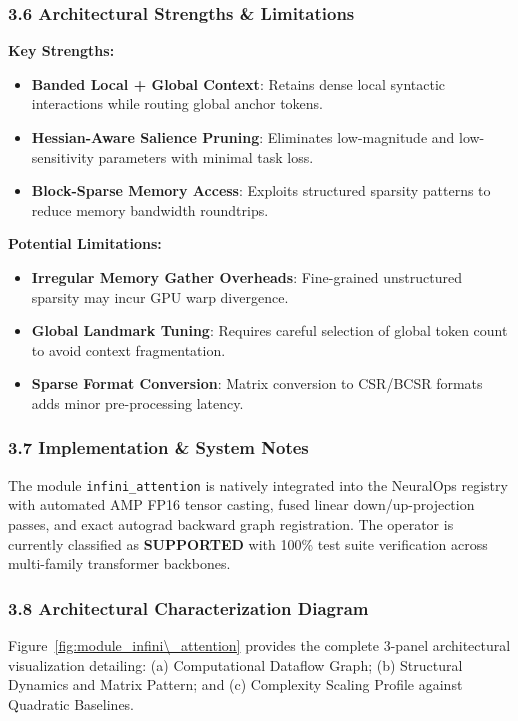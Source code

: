 \subsubsection*{3.6 Architectural Strengths \& Limitations}
\textbf{Key Strengths:}
\begin{itemize}
    \item \textbf{Banded Local + Global Context}: Retains dense local syntactic interactions while routing global anchor tokens.
    \item \textbf{Hessian-Aware Salience Pruning}: Eliminates low-magnitude and low-sensitivity parameters with minimal task loss.
    \item \textbf{Block-Sparse Memory Access}: Exploits structured sparsity patterns to reduce memory bandwidth roundtrips.
\end{itemize}

\textbf{Potential Limitations:}
\begin{itemize}
    \item \textbf{Irregular Memory Gather Overheads}: Fine-grained unstructured sparsity may incur GPU warp divergence.
    \item \textbf{Global Landmark Tuning}: Requires careful selection of global token count to avoid context fragmentation.
    \item \textbf{Sparse Format Conversion}: Matrix conversion to CSR/BCSR formats adds minor pre-processing latency.
\end{itemize}

\subsubsection*{3.7 Implementation \& System Notes}
The module \texttt{infini\_attention} is natively integrated into the NeuralOps registry with automated AMP FP16 tensor casting, fused linear down/up-projection passes, and exact autograd backward graph registration. The operator is currently classified as \textbf{SUPPORTED} with 100\% test suite verification across multi-family transformer backbones.

\subsubsection*{3.8 Architectural Characterization Diagram}
Figure~\ref{fig:module_infini\_attention} provides the complete 3-panel architectural visualization detailing: (a) Computational Dataflow Graph; (b) Structural Dynamics and Matrix Pattern; and (c) Complexity Scaling Profile against Quadratic Baselines.

